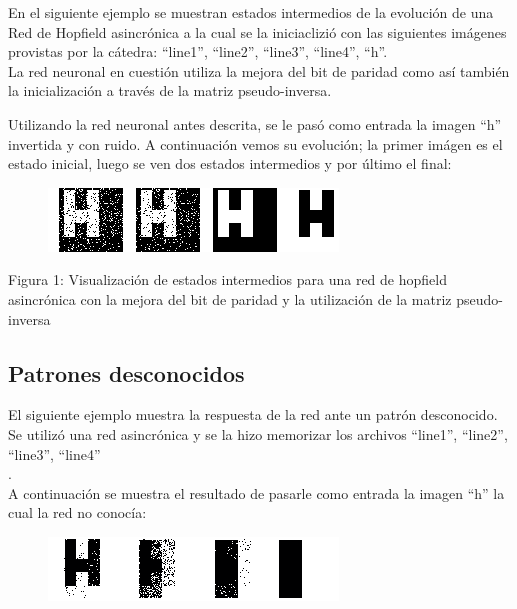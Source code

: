 \documentclass[%
    final,
    reprint,
    notitlepage,
    narroweqnarray,
    inline,
    twoside,
    invited
    ]{ieee}
\begin{document}
\par En el siguiente ejemplo se muestran estados intermedios de la evolución de una Red de Hopfield asincrónica a la cual se la iniciaclizió con las siguientes imágenes provistas por la cátedra: ``line1'', ``line2'', ``line3'', ``line4'', ``h''.\\
La red neuronal en cuestión utiliza la mejora del bit de paridad como así también la inicialización a través de la matriz pseudo-inversa.\\
\par Utilizando la red neuronal antes descrita, se le pasó como entrada la imagen ``h'' invertida y con ruido. A continuación vemos su evolución; la primer imágen es el estado inicial, luego se ven dos estados intermedios y por último el final:\\

\begin{figure}[H]
\begin{center}
\includegraphics[scale=0.60]{./images/hinvypar.png}
\label{modelado}
\end{center}
\end{figure}

\begin{center}
\par Figura 1: Visualización de estados intermedios para una red de hopfield asincrónica con la mejora del bit de paridad y la utilización de la matriz pseudo-inversa
\end{center}

\subsection{Patrones desconocidos}

\par El siguiente ejemplo muestra la respuesta de la red ante un patrón desconocido. Se utilizó una red asincrónica y se la hizo memorizar los archivos ``line1'', ``line2'', ``line3'', ``line4''\\.\\
A continuación se muestra el resultado de pasarle como entrada la imagen ``h''  la cual la red no conocía: \\

\begin{figure}[H]
\begin{center}
\includegraphics[scale=0.60]{./images/hnoinvnopar.png}
\label{modelado}
\end{center}
\end{figure}
\end{document}
